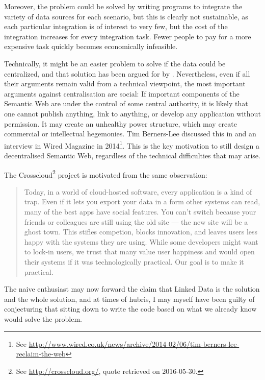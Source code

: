 Moreover, the problem could be solved by writing programs to integrate
the variety of data sources for each scenario, but this is clearly not
sustainable, as each particular integration is of interest to very
few, but the cost of the integration increases for every integration
task. Fewer people to pay for a more expensive task quickly becomes
economically infeasible.

Technically, it might be an easier problem to solve if the data could
be centralized, and that solution has been argued for by
\cite{DBLP:conf/semweb/BetzGHS12}. Nevertheless, even if all their
arguments remain valid from a technical viewpoint, the most important
arguments against centralisation are social: If important components
of the Semantic Web are under the control of some central authority, it
is likely that one cannot publish anything, link to anything, or
develop any application without permission. It may create an unhealthy
power structure, which may create commercial or intellectual
hegemonies. Tim Berners-Lee discussed this in \cite{berners2000weaving} and an
interview in Wired Magazine in 2014\footnote{See
  \url{http://www.wired.co.uk/news/archive/2014-02/06/tim-berners-lee-reclaim-the-web}}.
This is the key motivation to still design a decentralised Semantic Web,
regardless of the technical difficulties that may arise.

The Crosscloud\footnote{See \url{http://crosscloud.org/}, quote
  retrieved on 2016-05-30.} project is motivated from the same
observation:
\begin{quote}
Today, in a world of cloud-hosted software, every application is a
kind of trap. Even if it lets you export your data in a form other
systems can read, many of the best apps have social features. You
can't switch because your friends or colleagues are still using the
old site — the new site will be a ghost town. This stifles competion,
blocks innovation, and leaves users less happy with the systems they
are using. While some developers might want to lock-in users, we trust
that many value user happiness and would open their systems if it was
technologically practical. Our goal is to make it practical.
\end{quote}

The naive enthusiast may now forward the claim that Linked Data is the
solution and the whole solution, and at times of hubris, I may myself
have been guilty of conjecturing that sitting down to write the code
based on what we already know would solve the problem.

